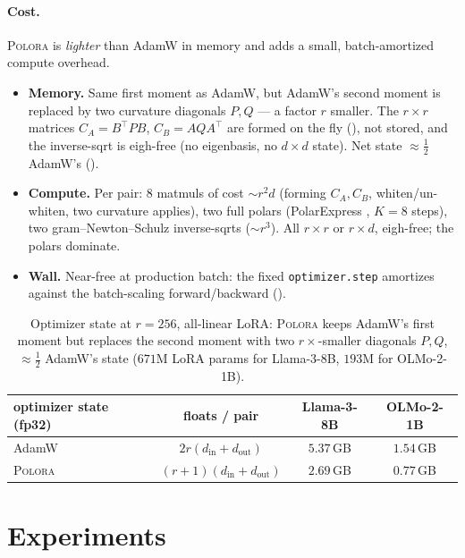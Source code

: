 \documentclass[11pt]{article}
\newcommand{\methodname}{\textsc{Polora}\xspace}
\theoremstyle{plain}
\theoremstyle{definition}
\theoremstyle{remark}
\begin{document}
\paragraph{Cost.} \methodname{} is \emph{lighter} than AdamW in memory and adds a small, batch-amortized compute overhead.
\begin{itemize}[leftmargin=1.5em,itemsep=1pt,topsep=2pt]
  \item \textbf{Memory.} Same first moment as AdamW, but AdamW's second moment is replaced by two curvature diagonals $P,Q$ --- a factor $r$ smaller. The $r\times r$ matrices $C_A=B^\top PB$, $C_B=AQA^\top$ are formed on the fly (), not stored, and the inverse-sqrt is eigh-free (no eigenbasis, no $d\times d$ state). Net state ${\approx}\tfrac12$ AdamW's ().
  \item \textbf{Compute.} Per pair: $8$ matmuls of cost ${\sim}r^2d$ (forming $C_A,C_B$, whiten/un-whiten, two curvature applies), two full polars (PolarExpress \cite{polarexpress}, $K{=}8$ steps), two gram--Newton--Schulz inverse-sqrts \cite{gram_ns} (${\sim}r^3$). All $r\times r$ or $r\times d$, eigh-free; the polars dominate.
  \item \textbf{Wall.} Near-free at production batch: the fixed \texttt{optimizer.step} amortizes against the batch-scaling forward/backward ().
\end{itemize}
\begin{table}[h]
\centering\small
\begin{tabular}{lccc}
\toprule
optimizer state (fp32) & floats / pair & Llama-3-8B & OLMo-2-1B \\
\midrule
AdamW         & $2r(d_{\mathrm{in}}{+}d_{\mathrm{out}})$     & $5.37$\,GB & $1.54$\,GB \\
\methodname{} & $(r{+}1)(d_{\mathrm{in}}{+}d_{\mathrm{out}})$ & $2.69$\,GB & $0.77$\,GB \\
\bottomrule
\end{tabular}
\caption{Optimizer state at $r{=}256$, all-linear LoRA: \methodname{} keeps AdamW's first moment but replaces the second moment with two $r{\times}$-smaller diagonals $P,Q$, ${\approx}\tfrac12$ AdamW's state ($671$M LoRA params for Llama-3-8B, $193$M for OLMo-2-1B).}
\label{tab:optstate}
\end{table}

\section{Experiments}
\label{sec:exp}
\end{document}
